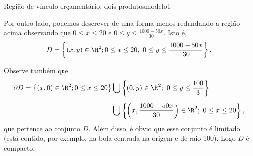 \begin{example}{Região de vínculo orçamentário: dois produtos}{modelo1}
\begin{center}
\end{center}

\newpage
Por outro lado, podemos descrever de uma forma menos redundando a região acima observando que $0\leq x\leq 20$ e $0 \leq y \leq \frac{1000-50x}{30}$. Isto é, 
$$D=\left\{(x,y)\in \R^2; 0\leq x\leq 20,~0\leq y \leq \frac{1000-50x}{30}\right\}.$$

Observe também que 
\begin{align*}
\partial D=\left\{(x,0)\in \R^2; 0\leq x \leq 20\right\}&\bigcup \left\{(0,y)\in\R^2;~0\leq y\leq \frac{100}{3}\right\}\\[.5em]
&\bigcup\left\{  \left(x,\frac{1000-50x}{30}\right)\in\R^2 ;~0\leq x\leq 20\right\},
\end{align*}
que pertence ao conjunto $D$. Além disso, é obvio que esse conjunto é limitado (está contido, por exemplo, na bola centrada na origem e de raio 100). Logo $D$ é compacto. 
\end{example}


